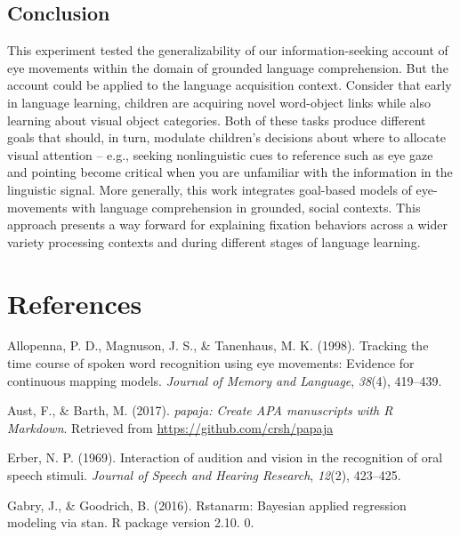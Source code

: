 \documentclass[english,man]{apa6}
\theoremstyle{definition}
\theoremstyle{definition}
\theoremstyle{definition}
\theoremstyle{remark}
\begin{document}
\hypertarget{conclusion}{%
\subsection{Conclusion}\label{conclusion}}

This experiment tested the generalizability of our information-seeking
account of eye movements within the domain of grounded language
comprehension. But the account could be applied to the language
acquisition context. Consider that early in language learning, children
are acquiring novel word-object links while also learning about visual
object categories. Both of these tasks produce different goals that
should, in turn, modulate children's decisions about where to allocate
visual attention -- e.g., seeking nonlinguistic cues to reference such
as eye gaze and pointing become critical when you are unfamiliar with
the information in the linguistic signal. More generally, this work
integrates goal-based models of eye-movements with language
comprehension in grounded, social contexts. This approach presents a way
forward for explaining fixation behaviors across a wider variety
processing contexts and during different stages of language learning.

\newpage

\hypertarget{references}{%
\section{References}\label{references}}

\setlength{\parindent}{-0.5in}
\setlength{\leftskip}{0.5in}

\hypertarget{refs}{}
\leavevmode\hypertarget{ref-allopenna1998tracking}{}%
Allopenna, P. D., Magnuson, J. S., \& Tanenhaus, M. K. (1998). Tracking
the time course of spoken word recognition using eye movements: Evidence
for continuous mapping models. \emph{Journal of Memory and Language},
\emph{38}(4), 419--439.

\leavevmode\hypertarget{ref-R-papaja}{}%
Aust, F., \& Barth, M. (2017). \emph{papaja: Create APA manuscripts with
R Markdown}. Retrieved from \url{https://github.com/crsh/papaja}

\leavevmode\hypertarget{ref-erber1969interaction}{}%
Erber, N. P. (1969). Interaction of audition and vision in the
recognition of oral speech stimuli. \emph{Journal of Speech and Hearing
Research}, \emph{12}(2), 423--425.

\leavevmode\hypertarget{ref-gabry2016rstanarm}{}%
Gabry, J., \& Goodrich, B. (2016). Rstanarm: Bayesian applied regression
modeling via stan. R package version 2.10. 0.
\end{document}
